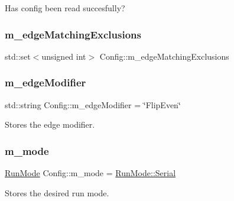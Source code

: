Has config been read succesfully? 

\mbox{\label{class_config_a98fedec819ec1ca13b66d82b806f49fd}} 
\subsubsection{\texorpdfstring{m\+\_\+edge\+Matching\+Exclusions}{m\_edgeMatchingExclusions}}
{\footnotesize\ttfamily std\+::set$<$unsigned int$>$ Config\+::m\+\_\+edge\+Matching\+Exclusions\hspace{0.3cm}{\ttfamily [private]}}

\mbox{\label{class_config_a70f6a43e8c14536beb7a03807c797d69}} 
\subsubsection{\texorpdfstring{m\+\_\+edge\+Modifier}{m\_edgeModifier}}
{\footnotesize\ttfamily std\+::string Config\+::m\+\_\+edge\+Modifier = \char`\"{}Flip\+Even\char`\"{}\hspace{0.3cm}{\ttfamily [private]}}



Stores the edge modifier. 

\mbox{\label{class_config_a65b1f233533ce1e2acd85f6a4a07c4d4}} 
\subsubsection{\texorpdfstring{m\+\_\+mode}{m\_mode}}
{\footnotesize\ttfamily \hyperlink{_modes_enum_8hpp_a3dfe11cf1a3a8121f6cd7fec4bf5947e}{Run\+Mode} Config\+::m\+\_\+mode = \hyperlink{_modes_enum_8hpp_a3dfe11cf1a3a8121f6cd7fec4bf5947eaab27270f353006b03c91367e05e44b94}{Run\+Mode\+::\+Serial}\hspace{0.3cm}{\ttfamily [private]}}



Stores the desired run mode. 

\mbox{\label{class_config_af1c0f310c245cfc6d9932646a36d5cf9}} 
